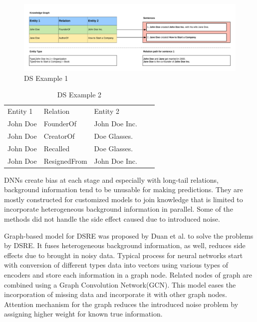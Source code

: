 \begin{figure}[h!]
	\centering
	\includegraphics[scale=0.15]{figures/dsexample.PNG}
	\caption{DS Example 1}
	\label{fig:dsexm}
\end{figure}

\begin{table}[]
	\centering
	\begin{tabular}{lllll}
		
		Entity 1 & Relation     & Entity 2      &  &  \\
		John Doe & FounderOf    & John Doe Inc. &  &  \\
		John Doe & CreatorOf    & Doe Glasses.  &  &  \\
		John Doe & Recalled     & Doe Glasses.  &  &  \\
		John Doe & ResignedFrom & John Doe Inc. &  & 
	\end{tabular}
	\caption{DS Example 2}
	\label{tab:johndoe}
\end{table}

DNNs create bias at each stage and especially with long-tail relations, background information tend to be unusable for making predictions. They are mostly constructed for customized models to join knowledge that is limited to incorporate heterogeneous background information in parallel. Some of the methods did not handle the side effect caused due to introduced noise. 

Graph-based model for DSRE was proposed by Duan et al.\cite{duan2019hybrid} to solve the problems by DSRE. It fuses heterogeneous background information, as well, reduces side effects due to brought in noisy data. Typical process for neural networks start with conversion of different types data into vectors using various types of encoders and store each information in a graph node. Related nodes of graph are combined using a Graph Convolution Network(GCN). This model eases the incorporation of missing data and incorporate it with other graph nodes. Attention mechanism for the graph reduces the introduced noise problem by assigning higher weight for known true information. 